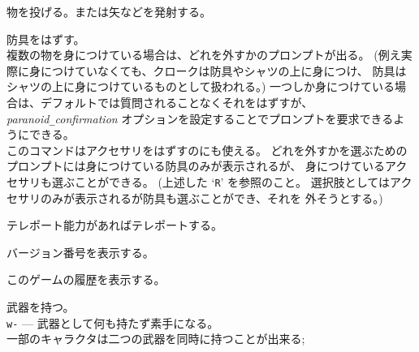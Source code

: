 物を投げる。または矢などを発射する。
\item[\tb{T}]
防具をはずす。\\
複数の物を身につけている場合は、どれを外すかのプロンプトが出る。
(例え実際に身につけていなくても、クロークは防具やシャツの上に身につけ、
防具はシャツの上に身につけているものとして扱われる。)
一つしか身につけている場合は、デフォルトでは質問されることなくそれをはずすが、
{\it paranoid\verb+_+confirmation\/}
オプションを設定することでプロンプトを要求できるようにできる。\\
このコマンドはアクセサリをはずすのにも使える。
どれを外すかを選ぶためのプロンプトには身につけている防具のみが表示されるが、
身につけているアクセサリも選ぶことができる。
(上述した `{\tt R}' を参照のこと。
選択肢としてはアクセサリのみが表示されるが防具も選ぶことができ、それを
外そうとする。)
\item[\tb{\^{}T}]
テレポート能力があればテレポートする。
\item[\tb{v}]
バージョン番号を表示する。
\item[\tb{V}]
このゲームの履歴を表示する。
\item[\tb{w}]
武器を持つ。\\
{\tt w-} --- 武器として何も持たず素手になる。\\
一部のキャラクタは二つの武器を同時に持つことが出来る;
